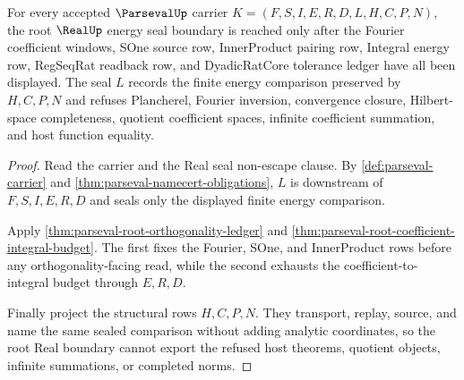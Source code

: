\begin{theorem}
\label{thm:parseval-root-real-energy-seal-boundary}
For every accepted $\ParsevalUp$ carrier $K=(F,S,I,E,R,D,L,H,C,P,N)$, the root $\RealUp$ energy seal boundary is reached only after the Fourier coefficient windows, SOne source row, InnerProduct pairing row, Integral energy row, RegSeqRat readback row, and DyadicRatCore tolerance ledger have all been displayed. The seal $L$ records the finite energy comparison preserved by $H,C,P,N$ and refuses Plancherel, Fourier inversion, convergence closure, Hilbert-space completeness, quotient coefficient spaces, infinite coefficient summation, and host function equality.
\end{theorem}
\begin{proof}
Read the carrier and the Real seal non-escape clause. By \autoref{def:parseval-carrier} and \autoref{thm:parseval-namecert-obligations}, $L$ is downstream of $F,S,I,E,R,D$ and seals only the displayed finite energy comparison.

Apply \autoref{thm:parseval-root-orthogonality-ledger} and \autoref{thm:parseval-root-coefficient-integral-budget}. The first fixes the Fourier, SOne, and InnerProduct rows before any orthogonality-facing read, while the second exhausts the coefficient-to-integral budget through $E,R,D$.

Finally project the structural rows $H,C,P,N$. They transport, replay, source, and name the same sealed comparison without adding analytic coordinates, so the root Real boundary cannot export the refused host theorems, quotient objects, infinite summations, or completed norms.
\end{proof}

